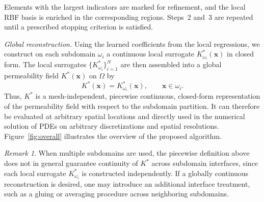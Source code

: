 \documentclass[final,1p,times]{elsarticle}
\theoremstyle{plain}
\theoremstyle{definition}
\theoremstyle{remark}
\newtheorem{remark}{Remark}          %
\newcommand{\Step}[2]{\item[Step #1.] #2}
\newcommand{\bx}{\mathbf{x}}
\begin{document}
\begin{computesteps}
{Elements with the largest indicators are marked for refinement, and the local RBF basis is enriched in the corresponding regions. Steps~2 and~3 are repeated until a prescribed stopping criterion is satisfied.
}


\Step{4}{\textit{Global reconstruction.}
Using the learned coefficients from the local regressions, we construct on each subdomain $\omega_i$ a continuous local surrogate $K^*_{\omega_i}(\bx)$ in closed form. The local surrogates $\{K^*_{\omega_i}\}_{i=1}^N$ are then assembled into a global permeability field $K^*(\bx)$ on $\Omega$ by
$$
K^*(\bx) = K^*_{\omega_i}(\bx), \qquad \bx \in \omega_i.
$$
Thus, $K^*$ is a mesh-independent, piecewise continuous, closed-form representation of the permeability field with respect to the subdomain partition. It can therefore be evaluated at arbitrary spatial locations and directly used in the numerical solution of PDEs on arbitrary discretizations and spatial resolutions. Figure~\ref{fig:overall} illustrates the overview of the proposed algorithm.
}

\end{computesteps}

\begin{remark}
When multiple subdomains are used, the piecewise definition above does not in general guarantee continuity of $K^*$ across subdomain interfaces, since each local surrogate $K^*_{\omega_i}$ is constructed independently. If a globally continuous reconstruction is desired, one may introduce an additional interface treatment, such as a gluing or averaging procedure across neighboring subdomains.
\end{remark}



\end{document}
